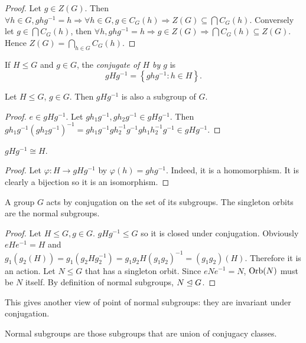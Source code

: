 \documentclass[a4paper]{article}
\begin{document}
\begin{proof}
  Let $g\in Z(G)$. Then $\forall h\in G, ghg^{-1}=h \Rightarrow
  \forall h\in G, g\in C_G(h) \Rightarrow Z(G)\subseteq \bigcap
  C_G(h)$. Conversely let $ g\in \bigcap C_G(h) $, then $ \forall h,
  ghg^{-1}=h \Rightarrow g\in Z(G) \Rightarrow \bigcap C_G(h)
  \subseteq Z(G) $. Hence $ Z(G)=\bigcap_{h\in G}C_G(h) $.
\end{proof}
\begin{definition}
  If $H\le G$ and $g\in G$, the \textit{conjugate of $H$ by $g$} is
  \[
    gHg^{-1}=\left\{ ghg^{-1}:h\in H \right\}
  .\]
\end{definition}
\begin{proposition}\label{prop:5.21}
  Let $H\le G$, $g\in G$. Then $gHg^{-1}$ is also a subgroup of $G$.
\end{proposition}
\begin{proof}
  $e\in gHg^{-1}$. Let $gh_1g^{-1},gh_2g^{-1}\in gHg^{-1}$. Then $
  gh_1g^{-1}(gh_2g^{-1})^{-1}=gh_1g^{-1}gh_2^{-1}g^{-1}gh_1h_2^{-1}g^{-1}\in
  gHg^{-1} $.
\end{proof}
\begin{proposition}
  $ gHg^{-1} \cong H $.
\end{proposition}
\begin{proof}
  Let $ \varphi: H \to gHg^{-1} $ by $ \varphi(h)=ghg^{-1} $. Indeed,
  it is a homomorphism. It is clearly a bijection so it is an isomorphism.
\end{proof}
\begin{proposition}\label{prop:5.22}
  A group $G$ acts by conjugation on the set of its subgroups. The
  singleton orbits are the normal subgroups.
\end{proposition}
\begin{proof}
  Let $H\le G, g\in G$. $ gHg^{-1}\le G $ so it is closed under
  conjugation. Obviously $ eHe^{-1}=H $ and $
  g_1(g_2(H))=g_1(g_2Hg_2^{-1})=g_1g_2H(g_1g_2)^{-1}=(g_1g_2)(H) $.
  Therefore it is an action. Let $N \le G$ that has a singleton
  orbit. Since $eNe^{-1}=N$, $ \operatorname{Orb}(N) $ must be $N$ itself. By
  definition of normal subgroups, $ N \trianglelefteq G $.
\end{proof}
\begin{remark}
  This gives another view of point of normal subgroups: they are
  invariant under conjugation.
\end{remark}
\begin{proposition}\label{prop:5.23}
  Normal subgroups are those subgroups that are union of conjugacy classes.
\end{proposition}
\end{document}
